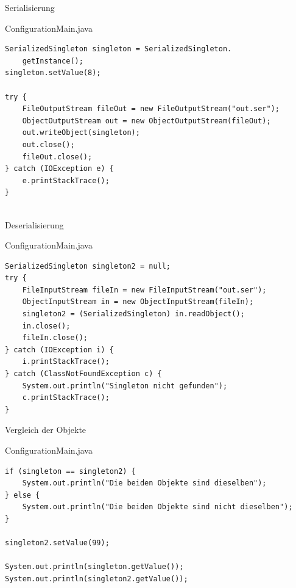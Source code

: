 \begin{frame}[fragile]{Serialisierung}
	\begin{exampleblock}{ConfigurationMain.java}
		\begin{lstlisting}
SerializedSingleton singleton = SerializedSingleton.
    getInstance();
singleton.setValue(8);

try {
    FileOutputStream fileOut = new FileOutputStream("out.ser");
    ObjectOutputStream out = new ObjectOutputStream(fileOut);
    out.writeObject(singleton);
    out.close();
    fileOut.close();
} catch (IOException e) {
    e.printStackTrace();
}
			    
		\end{lstlisting}
 	\end{exampleblock}
\end{frame}


\begin{frame}[fragile]{Deserialisierung}
	\begin{exampleblock}{ConfigurationMain.java}
		\begin{lstlisting}
SerializedSingleton singleton2 = null;
try {
    FileInputStream fileIn = new FileInputStream("out.ser");
    ObjectInputStream in = new ObjectInputStream(fileIn);
    singleton2 = (SerializedSingleton) in.readObject();
    in.close();
    fileIn.close();
} catch (IOException i) {
    i.printStackTrace();
} catch (ClassNotFoundException c) {
    System.out.println("Singleton nicht gefunden");
    c.printStackTrace();
}
		\end{lstlisting}
 	\end{exampleblock}
\end{frame}


\begin{frame}[fragile]{Vergleich der Objekte}
	\begin{alertblock}{ConfigurationMain.java}
		\begin{lstlisting}
if (singleton == singleton2) {
    System.out.println("Die beiden Objekte sind dieselben");
} else {
    System.out.println("Die beiden Objekte sind nicht dieselben");
}

singleton2.setValue(99);

System.out.println(singleton.getValue());
System.out.println(singleton2.getValue());
		\end{lstlisting}
 	\end{alertblock}
\end{frame}

